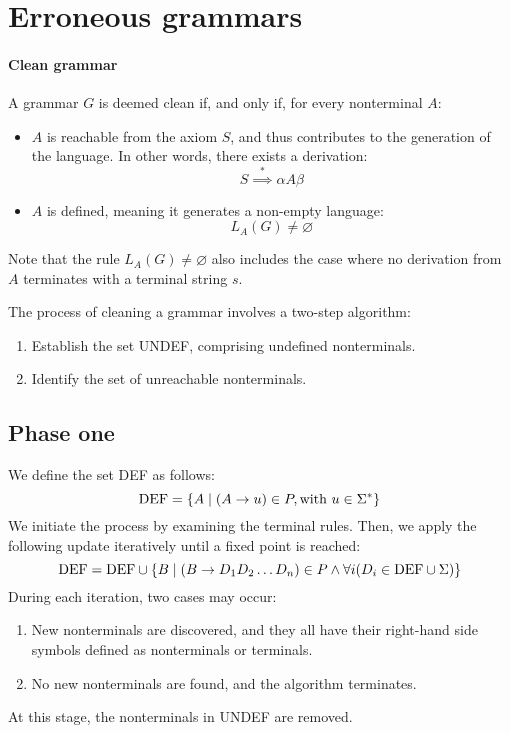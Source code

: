 \section{Erroneous grammars}

\paragraph*{Clean grammar}
A grammar $G$ is deemed clean  if, and only if, for every nonterminal $A$:
\begin{itemize}
    \item $A$ is reachable from the axiom $S$, and thus contributes to the generation of the language. 
        In other words, there exists a derivation:
        \[S \overset{\ast}{\implies} \alpha A \beta\]
    \item  $A$ is defined, meaning it generates a non-empty language:
        \[L_A(G) \neq \varnothing\]
\end{itemize}
Note that the rule $L_A(G) \neq \varnothing$ also includes the case where no derivation from $A$ terminates with a terminal string $s$.

The process of cleaning a grammar involves a two-step algorithm:
\begin{enumerate}
    \item Establish the set UNDEF, comprising undefined nonterminals.
    \item Identify the set of unreachable nonterminals.
\end{enumerate}

\subsection{Phase one}
We define the set DEF as follows:
\[\textnormal{DEF}=\{A\mid( A \rightarrow u ) \in P,\textnormal{with } u \in \Sigma^{\ast}\}\]
We initiate the process by examining the terminal rules. 
Then, we apply the following update iteratively until a fixed point is reached:
\[\textnormal{DEF}=\textnormal{DEF} \cup \{B\mid( B \rightarrow D_1D_2\dots D_n)\in P \land \forall i(D_i \in\textnormal{DEF} \cup \Sigma)\}\]
During each iteration, two cases may occur:
\begin{enumerate}
    \item New nonterminals are discovered, and they all have their right-hand side symbols defined as nonterminals or terminals.
    \item No new nonterminals are found, and the algorithm terminates.
\end{enumerate}
At this stage, the nonterminals in UNDEF are removed.

